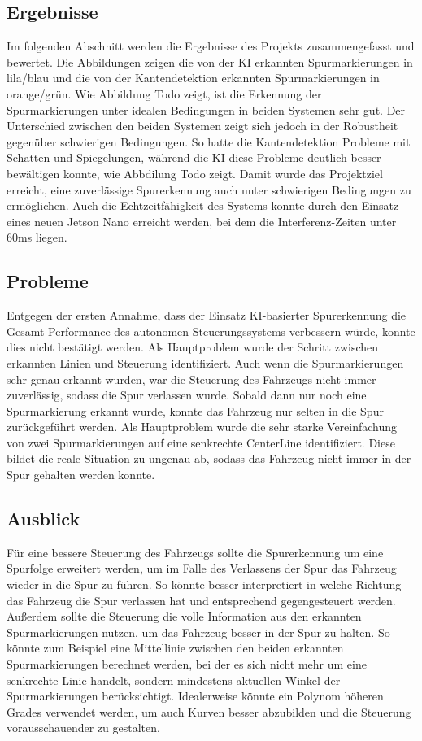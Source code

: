 \documentclass{article}
\begin{document}
        \subsection{Ergebnisse}
        Im folgenden Abschnitt werden die Ergebnisse des Projekts zusammengefasst und bewertet. Die Abbildungen %
        zeigen die von der KI erkannten Spurmarkierungen in lila/blau und die von der Kantendetektion erkannten Spurmarkierungen in orange/grün.
        Wie Abbildung Todo zeigt, ist die Erkennung der Spurmarkierungen unter idealen Bedingungen in beiden Systemen sehr gut.
        Der Unterschied zwischen den beiden Systemen zeigt sich jedoch in der Robustheit gegenüber schwierigen Bedingungen. So hatte die Kantendetektion Probleme mit Schatten und Spiegelungen, während die KI diese Probleme deutlich besser bewältigen konnte, wie Abbdilung Todo zeigt.
        Damit wurde das Projektziel erreicht, eine zuverlässige Spurerkennung auch unter schwierigen Bedingungen zu ermöglichen. Auch die Echtzeitfähigkeit des Systems konnte durch den Einsatz eines neuen Jetson Nano erreicht werden, bei dem die Interferenz-Zeiten unter 60ms liegen.
        \subsection{Probleme}
        Entgegen der ersten Annahme, dass der Einsatz KI-basierter Spurerkennung die Gesamt-Performance des autonomen Steuerungssystems verbessern würde, konnte dies nicht bestätigt werden.
        Als Hauptproblem wurde der Schritt zwischen erkannten Linien und Steuerung identifiziert. Auch wenn die Spurmarkierungen sehr genau erkannt wurden, war die Steuerung des Fahrzeugs nicht immer zuverlässig, sodass die Spur verlassen wurde. Sobald dann nur noch eine Spurmarkierung erkannt wurde, konnte das Fahrzeug nur selten in die Spur zurückgeführt werden.
        Als Hauptproblem wurde die sehr starke Vereinfachung von zwei Spurmarkierungen auf eine senkrechte CenterLine identifiziert.
        Diese bildet die reale Situation zu ungenau ab, sodass das Fahrzeug nicht immer in der Spur gehalten werden konnte.

        \subsection{Ausblick}
        Für eine bessere Steuerung des Fahrzeugs sollte die Spurerkennung um eine Spurfolge erweitert werden, um im Falle des Verlassens der Spur das Fahrzeug wieder in die Spur zu führen. So könnte besser interpretiert in welche Richtung das Fahrzeug die Spur verlassen hat und entsprechend gegengesteuert werden.
        Außerdem sollte die Steuerung die volle Information aus den erkannten Spurmarkierungen nutzen, um das Fahrzeug besser in der Spur zu halten. So könnte zum Beispiel eine Mittellinie zwischen den beiden erkannten Spurmarkierungen berechnet werden, bei der es sich nicht mehr um eine senkrechte Linie handelt, sondern mindestens aktuellen Winkel der Spurmarkierungen berücksichtigt. Idealerweise könnte ein Polynom höheren Grades verwendet werden, um auch Kurven besser abzubilden und die Steuerung vorausschauender zu gestalten.
\end{document}
